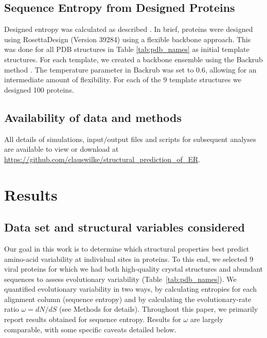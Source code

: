 \documentclass[12pt]{article}
\begin{document}
\subsection*{Sequence Entropy from Designed Proteins}

Designed entropy was calculated as described \citep{Jacksonetal2013}. In brief, proteins were designed using RosettaDesign (Version 39284) \citep{LeaverFayetal2011} using a flexible backbone approach. This was done for all PDB structures in Table \ref{tab:pdb_names} as initial template structures. For each template, we created a backbone ensemble using the Backrub method \citep{Smith2008}. The temperature parameter in Backrub was set to 0.6, allowing for an intermediate amount of flexibility.  For each of the 9 template structures we designed 100 proteins.

\subsection*{Availability of data and methods}

All details of simulations, input$/$output files and scripts for subsequent analyses are available to view or download at \url{https://github.com/clauswilke/structural\_prediction\_of\_ER}.

\section*{Results}

\subsection*{Data set and structural variables considered}

Our goal in this work is to determine which structural properties best predict amino-acid variability at individual sites in proteins. To this end, we selected 9 viral proteins for which we had both high-quality crystal structures and abundant sequences to assess evolutionary variability (Table~\ref{tab:pdb_names}). We quantified evolutionary variability in two ways, by calculating entropies for each alignment column (sequence entropy) and by calculating the evolutionary-rate ratio $\omega=dN/dS$ (see Methods for details). Throughout this paper, we primarily report results obtained for sequence entropy. Results for $\omega$ are largely comparable, with some specific caveats detailed below.
\end{document}

